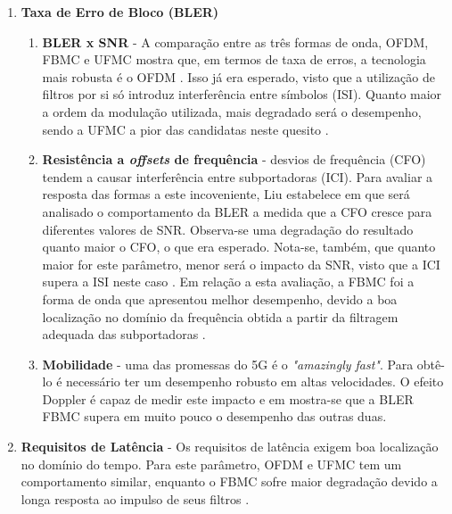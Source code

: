 \begin{enumerate}
\item \textbf{Taxa de Erro de Bloco (BLER)} \label{BLER}
\begin{enumerate}
\item \textbf{BLER x SNR} - A comparação entre as três formas de onda, OFDM, FBMC e UFMC mostra que, em termos de taxa de erros, a tecnologia mais robusta é o OFDM \cite{YinshengLiu} \cite{}. Isso já era esperado, visto que a utilização de filtros por si só introduz interferência entre símbolos (ISI). Quanto maior a ordem da modulação utilizada, mais degradado será o desempenho, sendo a UFMC a pior das candidatas neste quesito \cite{YinshengLiu}. 
\item \textbf{Resistência a \textit{offsets} de frequência} - desvios de frequência (CFO) tendem a causar interferência entre subportadoras (ICI). Para avaliar a resposta das formas a este incoveniente, Liu estabelece em \cite{YinshengLiu} que será analisado o comportamento da BLER a medida que a CFO cresce para diferentes valores de SNR. Observa-se uma degradação do resultado quanto maior o CFO, o que era esperado. Nota-se, também, que quanto maior for este parâmetro, menor será o impacto da SNR, visto que a ICI supera a ISI neste caso \cite{YinshengLiu}. Em relação a esta avaliação, a FBMC foi a forma de onda que apresentou melhor desempenho, devido a boa localização no domínio da frequência obtida a partir da filtragem adequada das subportadoras \cite{Boroujeny}. 	
\item \textbf{Mobilidade} - uma das promessas do 5G é o \textit{"amazingly fast"}. Para obtê-lo é necessário ter um desempenho robusto em altas velocidades. O efeito Doppler é capaz de medir este impacto e em \cite{YinshengLiu} mostra-se que a BLER FBMC supera em muito pouco o desempenho das outras duas. 
\end{enumerate}

\item \textbf{Requisitos de Latência} -  Os requisitos de latência exigem boa localização no domínio do tempo. Para este parâmetro, OFDM e UFMC tem um comportamento similar, enquanto o FBMC sofre maior degradação devido a longa resposta ao impulso de seus filtros \cite{YinshengLiu}. 


\end{enumerate}
